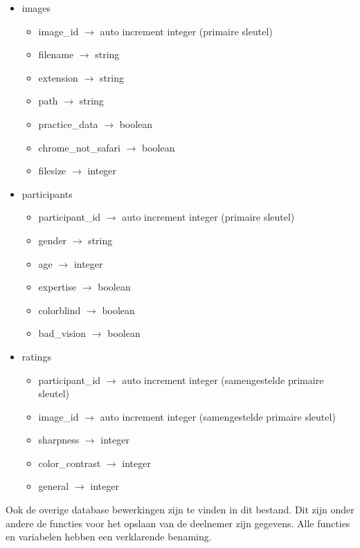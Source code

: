 \begin{itemize}
	
	\item images
	\begin{itemize}
		\item image\_id $\rightarrow$ auto increment integer (primaire sleutel)
		\item filename $\rightarrow$ string 
		\item extension $\rightarrow$ string 
		\item path $\rightarrow$ string 
		\item practice\_data $\rightarrow$ boolean 
		\item chrome\_not\_safari $\rightarrow$ boolean
		\item filesize $\rightarrow$ integer
	\end{itemize}

	\item participants
	\begin{itemize}
		\item participant\_id $\rightarrow$ auto increment integer (primaire sleutel)
		\item gender $\rightarrow$ string 
		\item age $\rightarrow$ integer 
		\item expertise $\rightarrow$ boolean 
		\item colorblind $\rightarrow$ boolean 
		\item bad\_vision $\rightarrow$ boolean
	\end{itemize}

	\item ratings
	\begin{itemize}
		\item participant\_id $\rightarrow$ auto increment integer (samengestelde primaire sleutel)
		\item image\_id $\rightarrow$ auto increment integer (samengestelde primaire sleutel)
		\item sharpness $\rightarrow$ integer 
		\item color\_contrast $\rightarrow$ integer 
		\item general $\rightarrow$ integer
	\end{itemize}

\end{itemize}

Ook de overige database bewerkingen zijn te vinden in dit bestand. Dit zijn onder andere de functies voor het opslaan van de deelnemer zijn gegevens. Alle functies en variabelen hebben een verklarende benaming.

